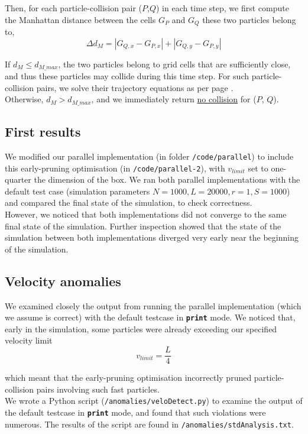 \documentclass[12pt]{article}
\newcommand{\bt}[1]{\texttt{\textbf{#1}}}
\begin{document}
Then, for each particle-collision pair ($P$,$Q$) in each time step, we first compute the Manhattan distance between the cells $G_P$ and $G_Q$ these two particles belong to,
$$\Delta d_M=\left| G_{Q,x} - G_{P,x} \right| + \left| G_{Q,y} - G_{P,y} \right|$$

If $d_M \leq d_{M\_max}$, the two particles belong to grid cells that are sufficiently close, and thus these particles may collide during this time step. For such particle-collision pairs, we solve their trajectory equations as per page \pageref{trajectory-calc}. \\

Otherwise, $d_M > d_{M\_max}$, and we immediately return \ul{no collision} for ($P$, $Q$).

\subsection{First results}

We modified our parallel implementation (in folder \texttt{/code/parallel}) to include this early-pruning optimisation (in \texttt{/code/parallel-2}), with $v_{limit}$ set to one-quarter the dimension of the box. We ran both parallel implementations with the default test case (simulation parameters $N=1000, L=20000, r=1, S=1000$) and compared the final state of the simulation, to check correctness. \\

However, we noticed that both implementations did not converge to the same final state of the simulation. Further inspection showed that the state of the simulation between both implementations diverged very early near the beginning of the simulation.

\subsection{Velocity anomalies}

We examined closely the output from running the parallel implementation (which we assume is correct) with the default testcase in \bt{print} mode. We noticed that, early in the simulation, some particles were already exceeding our specified velocity limit
$$v_{limit} = \frac{L}{4}$$

which meant that the early-pruning optimisation incorrectly pruned particle-collision pairs involving such fast particles. \\

We wrote a Python script (\texttt{/anomalies/veloDetect.py}) to examine the output of the default testcase in \bt{print} mode, and found that such violations were numerous. The results of the script are found in \texttt{/anomalies/stdAnalysis.txt}. \\
\end{document}

